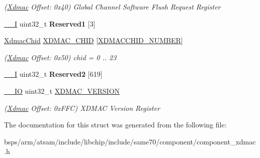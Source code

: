 \begin{DoxyCompactItemize}
\begin{DoxyCompactList}\small\item\em (\mbox{\hyperlink{structXdmac}{Xdmac}} Offset\+: 0x40) Global Channel Software Flush Request Register \end{DoxyCompactList}\item 
\mbox{\label{structXdmac_a0b4180209929aa5d6f9f6614fe269460}} 
\mbox{\hyperlink{core__cm7_8h_af63697ed9952cc71e1225efe205f6cd3}{\+\_\+\+\_\+I}} uint32\+\_\+t {\bfseries Reserved1} \mbox{[}3\mbox{]}
\item 
\mbox{\label{structXdmac_a346e87d05248f539dd36192b8a954294}} 
\mbox{\hyperlink{structXdmacChid}{Xdmac\+Chid}} \mbox{\hyperlink{structXdmac_a346e87d05248f539dd36192b8a954294}{X\+D\+M\+A\+C\+\_\+\+C\+H\+ID}} \mbox{[}\mbox{\hyperlink{group__SAMV71__XDMAC_gaaf818f6567ac43dc9885685b5d2fbda3}{X\+D\+M\+A\+C\+C\+H\+I\+D\+\_\+\+N\+U\+M\+B\+ER}}\mbox{]}
\begin{DoxyCompactList}\small\item\em (\mbox{\hyperlink{structXdmac}{Xdmac}} Offset\+: 0x50) chid = 0 .. 23 \end{DoxyCompactList}\item 
\mbox{\label{structXdmac_a715e502b98ceb30649580b076eccd1c4}} 
\mbox{\hyperlink{core__cm7_8h_af63697ed9952cc71e1225efe205f6cd3}{\+\_\+\+\_\+I}} uint32\+\_\+t {\bfseries Reserved2} \mbox{[}619\mbox{]}
\item 
\mbox{\label{structXdmac_a912be34bc9250ad4ee88a562d9a35e34}} 
\mbox{\hyperlink{core__cm7_8h_aec43007d9998a0a0e01faede4133d6be}{\+\_\+\+\_\+\+IO}} uint32\+\_\+t \mbox{\hyperlink{structXdmac_a912be34bc9250ad4ee88a562d9a35e34}{X\+D\+M\+A\+C\+\_\+\+V\+E\+R\+S\+I\+ON}}
\begin{DoxyCompactList}\small\item\em (\mbox{\hyperlink{structXdmac}{Xdmac}} Offset\+: 0x\+F\+FC) X\+D\+M\+AC Version Register \end{DoxyCompactList}\end{DoxyCompactItemize}


The documentation for this struct was generated from the following file\+:\begin{DoxyCompactItemize}
\item 
bsps/arm/atsam/include/libchip/include/same70/component/component\+\_\+xdmac.\+h\end{DoxyCompactItemize}
